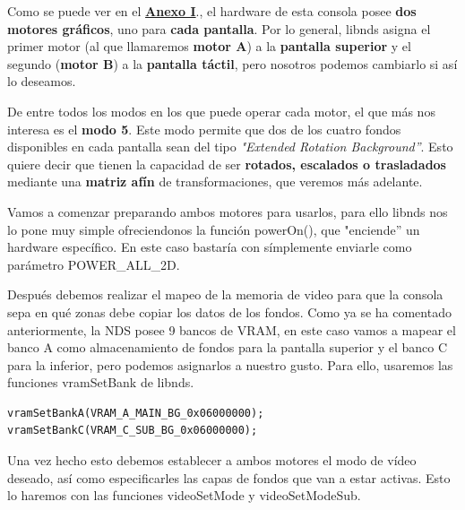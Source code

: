\vspace{0.5cm}

Como se puede ver en el \hyperref[anexo]{\textbf{Anexo I}}., el hardware de esta consola posee \textbf{dos motores gráficos}, uno para \textbf{cada pantalla}. Por lo general, libnds asigna el primer motor (al que llamaremos \textbf{motor A}) a la \textbf{pantalla superior} y el segundo (\textbf{motor B}) a la \textbf{pantalla táctil}, pero nosotros podemos cambiarlo si así lo deseamos.

\vspace{0.5cm}

De entre  todos los modos en los que puede operar cada motor, el que más nos interesa es el \textbf{modo 5}. Este modo permite que dos de los cuatro fondos disponibles en cada pantalla sean del tipo \textit{"Extended Rotation Background''}. Esto quiere decir que tienen la capacidad de ser \textbf{rotados, escalados o trasladados} mediante una \textbf{matriz afín} de transformaciones, que veremos más adelante. 

\vspace{0.5cm}

Vamos a comenzar preparando ambos motores para usarlos, para ello libnds nos lo pone muy simple ofreciendonos la función powerOn(), que "enciende'' un hardware específico. En este caso bastaría con símplemente enviarle como parámetro POWER\_ALL\_2D.

\vspace{0.5cm}

Después debemos realizar el mapeo de la memoria de video para que la consola sepa en qué zonas debe copiar los datos de los fondos. Como ya se ha comentado anteriormente, la NDS posee 9 bancos de VRAM, en este caso vamos a mapear el banco A como almacenamiento de fondos para la pantalla superior y el banco C para la inferior, pero podemos asignarlos a nuestro gusto. Para ello, usaremos las funciones vramSetBank de libnds.

\vspace{0.5cm}

\begin{lstlisting}[caption={Mapeo de memoria de video}, label={code:setbanks}]
vramSetBankA(VRAM_A_MAIN_BG_0x06000000);
vramSetBankC(VRAM_C_SUB_BG_0x06000000);
\end{lstlisting}

\vspace{0.5cm}

Una vez hecho esto debemos establecer a ambos motores el modo de vídeo deseado, así como especificarles las capas de fondos que van a estar activas. Esto lo haremos con las funciones videoSetMode y videoSetModeSub.

